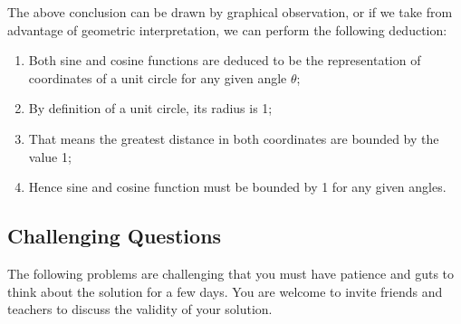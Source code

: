 \documentclass[12pt]{article}
\begin{document}
    The above conclusion can be drawn by graphical observation, or if we take from advantage of geometric interpretation, we can perform the following deduction:\begin{enumerate}
        \item Both sine and cosine functions are deduced to be the representation of coordinates of a unit circle for any given angle $\theta$;
        \item By definition of a unit circle, its radius is 1;
        \item That means the greatest distance in both coordinates are bounded by the value 1;
        \item Hence sine and cosine function must be bounded by 1 for any given angles.
    \end{enumerate}

    \subsection{Challenging Questions}

    The following problems are challenging that you must have patience and guts to think about the solution for a few days. You are welcome to invite friends and teachers to discuss the validity of your solution.
\end{document}
